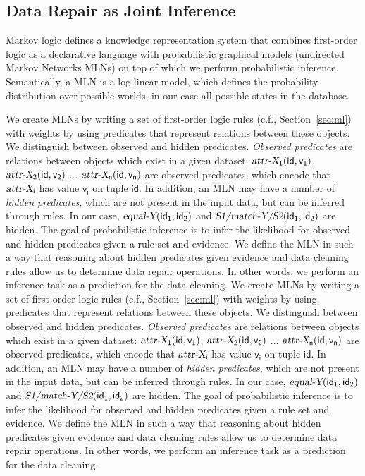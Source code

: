 \subsection{Data Repair as Joint Inference}
\label{subsec:jointinference}
Markov logic defines a knowledge representation system that combines first-order logic as a declarative language with probabilistic graphical models (undirected Markov Networks MLNs) on top of which we perform probabilistic inference. Semantically, a MLN is a log-linear model, which defines the probability distribution over possible worlds, in our case all possible states in the database.

We create MLNs by writing a set of first-order logic rules (c.f., Section~\ref{sec:ml}) with weights by using predicates that represent relations between these objects. We distinguish between observed and hidden predicates. \textit{Observed predicates} are relations between objects which exist in a given dataset: $\mathsf{\textsl{attr-X}_1(id,v_1)}$, $\mathsf{\textsl{attr-X}_2(id,v_2)}$ $\dots$ $\mathsf{\textsl{attr-X}_n(id,v_n)}$ are observed predicates, which encode that $\mathsf{\textsl{attr-X}_i}$ has value $\mathsf{v_i}$ on tuple $\mathsf{id}$. In addition, an MLN may have a number of \textit{hidden predicates}, which are not present in the input data, but can be inferred through rules. In our case, $\mathsf{\textsl{equal-Y}(id_1, id_2)}$ and $\mathsf{\textsl{S1/match-Y/S2}(id_1, id_2)}$ are hidden.  The goal of probabilistic inference is to infer the likelihood for observed and hidden predicates given a rule set and evidence. We define the MLN in such a way that reasoning about hidden predicates given evidence and data cleaning rules allow us to determine data repair operations. In other words, we perform an inference task as a prediction for the data cleaning.
We create MLNs by writing a set of first-order logic rules (c.f., Section~\ref{sec:ml}) with weights by using predicates that represent relations between these objects. We distinguish between observed and hidden predicates. \textit{Observed predicates} are relations between objects which exist in a given dataset: $\mathsf{\textsl{attr-X}_1(id,v_1)}$, $\mathsf{\textsl{attr-X}_2(id,v_2)}$ $\dots$ $\mathsf{\textsl{attr-X}_n(id,v_n)}$ are observed predicates, which encode that $\mathsf{\textsl{attr-X}_i}$ has value $\mathsf{v_i}$ on tuple $\mathsf{id}$. In addition, an MLN may have a number of \textit{hidden predicates}, which are not present in the input data, but can be inferred through rules. In our case, $\mathsf{\textsl{equal-Y}(id_1, id_2)}$ and $\mathsf{\textsl{S1/match-Y/S2}(id_1, id_2)}$ are hidden.  The goal of probabilistic inference is to infer the likelihood for observed and hidden predicates given a rule set and evidence. We define the MLN in such a way that reasoning about hidden predicates given evidence and data cleaning rules allow us to determine data repair operations. In other words, we perform an inference task as a prediction for the data cleaning.

